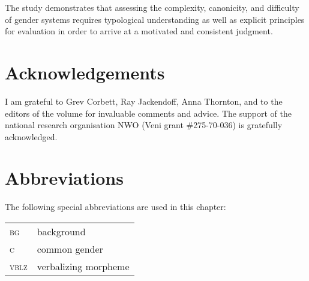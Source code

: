\documentclass[output=collectionpaper]{langsci/langscibook}
\begin{document}
The study demonstrates that assessing the complexity, canonicity, and difficulty of gender systems requires typological understanding as well as explicit principles for evaluation in order to arrive at a motivated and consistent judgment.

\section*{Acknowledgements}

I am grateful to Grev Corbett, Ray Jackendoff, Anna Thornton, and to the editors of the volume for invaluable comments and advice. The support of the  national research organisation NWO (Veni grant \#275-70-036) is gratefully acknowledged.

\section*{Abbreviations}

The following special abbreviations are used in this chapter:
\medskip

\begin{tabular}{ll}
\textsc{bg} & background \\
\textsc{c} & common gender \\
\textsc{vblz} & verbalizing morpheme \\
\end{tabular}


\printbibliography[heading=subbibliography,notkeyword=this]
\end{document}
